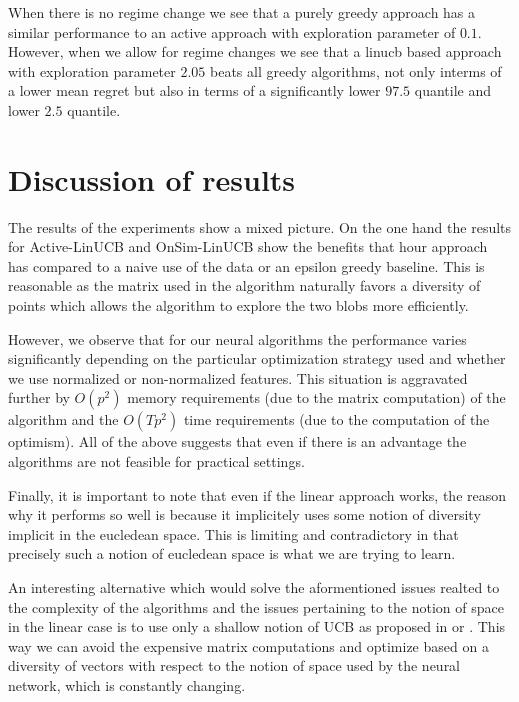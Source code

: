 \documentclass{article}
\begin{document}
When there is no regime change we see that a purely greedy approach has a similar performance to an active approach with exploration parameter
of $0.1$.
However, when we allow for regime changes we see that a linucb based approach with exploration parameter $2.05$ beats all greedy algorithms,
not only interms of a lower mean regret but also in terms of a significantly lower $97.5$ quantile and lower $2.5$ quantile.

\section{Discussion of results}
The results of the experiments show a mixed picture.
On the one hand the results for Active-LinUCB and OnSim-LinUCB show the benefits that hour approach has
compared to a naive use of the data or an epsilon greedy baseline.
This is reasonable as the matrix used in the algorithm naturally favors a diversity of points which allows
the algorithm to explore the two blobs more efficiently.

However, we observe that for our neural algorithms the performance varies significantly depending on the particular optimization
strategy used and whether we use normalized or non-normalized features.
This situation is aggravated further by $O(p^2)$ memory requirements (due to the matrix computation) of the algorithm and the $O(Tp^2)$ time requirements (due to the computation of the optimism).
All of the above suggests that even if there is an advantage the algorithms are not feasible for practical settings.

Finally, it is important to note that even if the linear approach works, the reason why it performs so well is because it implicitely uses
some notion of diversity implicit in the eucledean space.
This is limiting and contradictory in that precisely such a notion of eucledean space is what we are trying to learn.

An interesting alternative which would solve the aformentioned issues realted to the complexity of the algorithms and
the issues pertaining to the notion of space in the linear case is to use only a shallow notion of UCB as proposed in \cite{shallow} or
\cite{deep-bayesian-bandits-show-down}.
This way we can avoid the expensive matrix computations and optimize based on a diversity of vectors with respect to the notion of space
used by the neural network, which is constantly changing.
\end{document}
